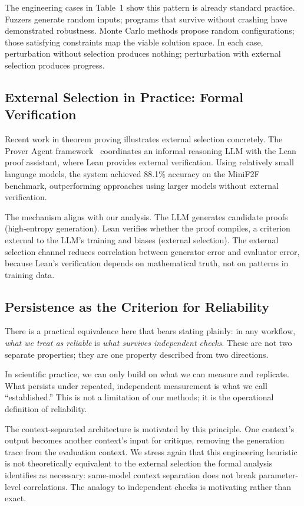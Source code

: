 \documentclass[11pt]{article}
\begin{document}
The engineering cases in Table~1 show this pattern is already standard practice. Fuzzers
generate random inputs; programs that survive without crashing have demonstrated robustness.
Monte Carlo methods propose random configurations; those satisfying constraints map the
viable solution space. In each case, perturbation without selection produces nothing;
perturbation with external selection produces progress.

\subsection{External Selection in Practice: Formal Verification}

Recent work in theorem proving illustrates external selection concretely. The Prover Agent
framework~\citep{baba2025prover} coordinates an informal reasoning LLM with the Lean proof
assistant, where Lean provides external verification. Using relatively small language models,
the system achieved 88.1\% accuracy on the MiniF2F benchmark, outperforming approaches
using larger models without external verification.

The mechanism aligns with our analysis. The LLM generates candidate proofs (high-entropy
generation). Lean verifies whether the proof compiles, a criterion external to the LLM's
training and biases (external selection). The external selection channel reduces correlation
between generator error and evaluator error, because Lean's verification depends on
mathematical truth, not on patterns in training data.

\subsection{Persistence as the Criterion for Reliability}

There is a practical equivalence here that bears stating plainly: in any workflow,
\textit{what we treat as reliable} is \textit{what survives independent checks}. These are
not two separate properties; they are one property described from two directions.

In scientific practice, we can only build on what we can measure and replicate. What persists
under repeated, independent measurement is what we call ``established.'' This is not a
limitation of our methods; it is the operational definition of reliability.

The context-separated architecture is motivated by this principle. One context's output
becomes another context's input for critique, removing the generation trace from the
evaluation context. We stress again that this engineering heuristic is not theoretically
equivalent to the external selection the formal analysis identifies as necessary: same-model
context separation does not break parameter-level correlations. The analogy to independent
checks is motivating rather than exact.
\end{document}
